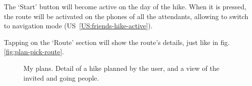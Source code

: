 The `Start' button will become active on the day of the hike.
When it is pressed, the route will be activated on the phones of all the attendants, allowing to switch to navigation mode (US~\ref{US:friends-hike-active}).

Tapping on the `Route' section will show the route's details, just like in fig.\ref{fig:plan-pick-route}.

\begin{figure}[h!]
    \centering
    \hfill
    \hfill
    \hfill
    \caption{My plans. Detail of a hike planned by the user, and a view of the invited and going people.}
    \label{fig:plan-my-plans}
\end{figure}


